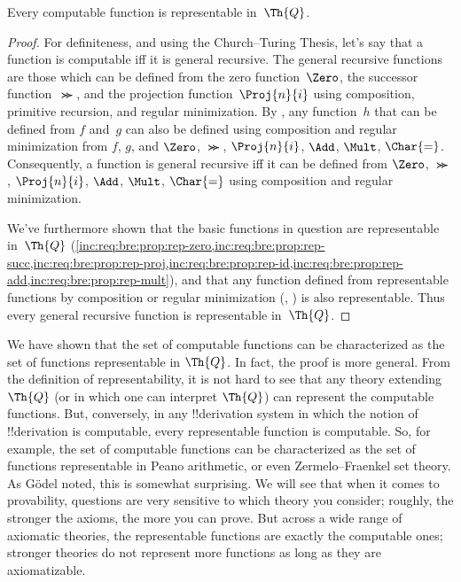 \documentclass[../../../include/open-logic-section]{subfiles}
\begin{document}

\begin{thm}
Every computable function is representable in~$\Th{Q}$.
\end{thm}

\begin{proof}
For definiteness, and using the Church--Turing Thesis, let's say that a
function is computable iff it is general recursive. The general
recursive functions are those which can be defined from the zero
function~$\Zero$, the successor function~$\Succ$, and the projection
function~$\Proj{n}{i}$ using composition, primitive recursion, and
regular minimization. By , any function~$h$
that can be defined from $f$ and~$g$ can also be defined using
composition and regular minimization from $f$, $g$, and $\Zero$,
$\Succ$, $\Proj{n}{i}$, $\Add$, $\Mult$, $\Char{=}$. Consequently, a
function is general recursive iff it can be defined from $\Zero$,
$\Succ$, $\Proj{n}{i}$, $\Add$, $\Mult$, $\Char{=}$ using composition
and regular minimization.

We've furthermore shown that the basic functions in question are
representable in~$\Th{Q}$
(\cref{inc:req:bre:prop:rep-zero,inc:req:bre:prop:rep-succ,inc:req:bre:prop:rep-proj,inc:req:bre:prop:rep-id,inc:req:bre:prop:rep-add,inc:req:bre:prop:rep-mult}),
and that any function defined from representable functions by
composition or regular minimization
(,
) is also representable. Thus every
general recursive function is representable in~$\Th{Q}$.
\end{proof}

\begin{explain}
We have shown that the set of computable functions can be
characterized as the set of functions representable in $\Th{Q}$. In
fact, the proof is more general. From the definition of
representability, it is not hard to see that any theory extending
$\Th{Q}$ (or in which one can interpret $\Th{Q}$) can represent the
computable functions. But, conversely, in any !!{derivation} system in
which the notion of !!{derivation} is computable, every representable
function is computable. So, for example, the set of computable
functions can be characterized as the set of functions representable
in Peano arithmetic, or even Zermelo--Fraenkel set theory. As G\"odel
noted, this is somewhat surprising.  We will see that when it comes to
provability, questions are very sensitive to which theory you
consider; roughly, the stronger the axioms, the more you can prove.
But across a wide range of axiomatic theories, the representable
functions are exactly the computable ones; stronger theories do not
represent more functions as long as they are axiomatizable.
\end{explain}
\end{document}

